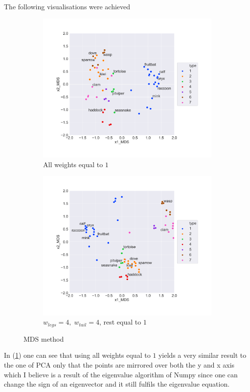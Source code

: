 The following visualisations were achieved
\begin{figure}[H]
   \centering
   \begin{subfigure}[b]{0.6\linewidth}
       \centering
       \includegraphics[width=\textwidth]{../Visualization_MDS_no_weights.png}
       \caption{All weights equal to $1$}
       \label{fig:vis_MDS1}
   \end{subfigure}
   \hspace{\fill}
   \begin{subfigure}[b]{0.6\linewidth}
       \centering
       \includegraphics[width=\textwidth]{../Visualization_MDS_with_weights.png}
       \caption{$w_{legs} = 4, \; w_{tail} = 4$, rest equal to $1$}
       \label{fig:vis_MDS2}
   \end{subfigure}
      \caption{MDS method}
      \label{fig:MDS}

\end{figure}
In (\ref{fig:vis_MDS1}) one can see that using all weights equal to $1$ yields a very similar result to the one of PCA only that the points are mirrored over both the y and x axis which I believe is a result of the eigenvalue algorithm of Numpy since one can change the sign of an eigenvector and it still fulfils the eigenvalue equation.

